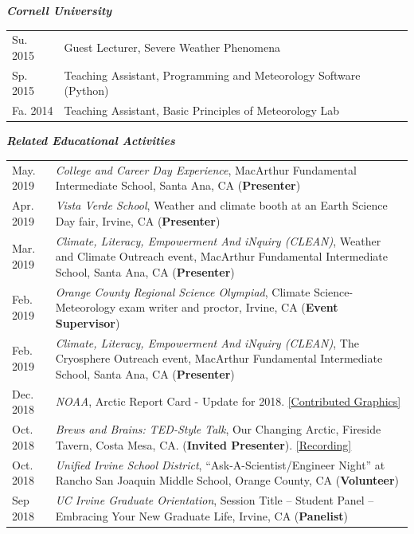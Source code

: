\documentclass[margin,line,palatino,courier,10pt]{res}
\begin{document}
\begin{resume}
\textit{\textbf{Cornell University}}
\vspace*{0.05in}\\
\begin{tabular}{@{}p{0.9in}p{4in}}
Su. 2015 & Guest Lecturer, Severe Weather Phenomena\\
Sp. 2015 & Teaching Assistant, Programming and Meteorology Software (Python)\\
Fa. 2014 & Teaching Assistant, Basic Principles of Meteorology Lab\\
\end{tabular}

\textit{\textbf{Related Educational Activities}}
\vspace*{0.05in}\\
\begin{tabular}{@{}p{0.9in}p{4in}}
May. 2019 & \textit{College and Career Day Experience}, MacArthur Fundamental Intermediate School, Santa Ana, CA (\textbf{Presenter})\\
Apr. 2019 & \textit{Vista Verde School}, Weather and climate booth at an Earth Science Day fair, Irvine, CA (\textbf{Presenter})\\
Mar. 2019 & \textit{Climate, Literacy, Empowerment And iNquiry (CLEAN)}, Weather and Climate Outreach event, MacArthur Fundamental Intermediate School, Santa Ana, CA (\textbf{Presenter})\\
Feb. 2019 & \textit{Orange County Regional Science Olympiad}, Climate Science-Meteorology exam writer and proctor, Irvine, CA (\textbf{Event Supervisor})\\
Feb. 2019 & \textit{Climate, Literacy, Empowerment And iNquiry (CLEAN)}, The Cryosphere Outreach event, MacArthur Fundamental Intermediate School, Santa Ana, CA (\textbf{Presenter})\\
Dec. 2018 & \textit{NOAA}, Arctic Report Card - Update for 2018. \href{https://www.youtube.com/watch?v=XntO9a-NpeM}{[Contributed Graphics]}\\
Oct. 2018 & \textit{Brews and Brains: TED-Style Talk}, Our Changing Arctic, Fireside Tavern, Costa Mesa, CA. (\textbf{Invited Presenter}). \href{https://www.youtube.com/watch?v=A5qQpDtOdvg}{[Recording]}\\
Oct. 2018 & \textit{Unified Irvine School District}, ``Ask-A-Scientist/Engineer Night'' at Rancho San Joaquin Middle School, Orange County, CA (\textbf{Volunteer})\\
Sep 2018 & \textit{UC Irvine Graduate Orientation}, Session Title -- Student Panel -- Embracing Your New Graduate Life, Irvine, CA (\textbf{Panelist})\\

\end{tabular}
\end{resume}
\end{document}
